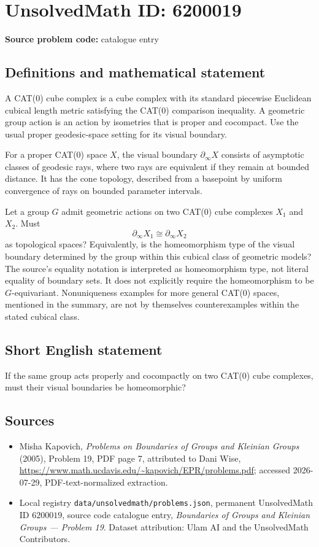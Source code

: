 \documentclass[11pt]{article}
\begin{document}
\section*{UnsolvedMath ID: 6200019}
\textbf{Source problem code:} catalogue entry
\subsection{Definitions and mathematical statement}
A CAT(0) cube complex is a cube complex with its standard piecewise Euclidean cubical length metric satisfying the CAT(0) comparison inequality. A geometric group action is an action by isometries that is proper and cocompact. Use the usual proper geodesic-space setting for its visual boundary.

For a proper CAT(0) space $X$, the visual boundary $\partial_\infty X$ consists of asymptotic classes of geodesic rays, where two rays are equivalent if they remain at bounded distance. It has the cone topology, described from a basepoint by uniform convergence of rays on bounded parameter intervals.

Let a group $G$ admit geometric actions on two CAT(0) cube complexes $X_1$ and $X_2$. Must
\[
\partial_\infty X_1\cong\partial_\infty X_2
\]
as topological spaces? Equivalently, is the homeomorphism type of the visual boundary determined by the group within this cubical class of geometric models? The source's equality notation is interpreted as homeomorphism type, not literal equality of boundary sets. It does not explicitly require the homeomorphism to be $G$-equivariant. Nonuniqueness examples for more general CAT(0) spaces, mentioned in the summary, are not by themselves counterexamples within the stated cubical class.
\subsection{Short English statement}
If the same group acts properly and cocompactly on two CAT(0) cube complexes, must their visual boundaries be homeomorphic?
\subsection{Sources}
\begin{itemize}
\item Misha Kapovich, \emph{Problems on Boundaries of Groups and Kleinian Groups} (2005), Problem 19, PDF page 7, attributed to Dani Wise, \url{https://www.math.ucdavis.edu/~kapovich/EPR/problems.pdf}; accessed 2026-07-29, PDF-text-normalized extraction.
\item Local registry \texttt{data/unsolvedmath/problems.json}, permanent UnsolvedMath ID $6200019$, source code catalogue entry, \emph{Boundaries of Groups and Kleinian Groups --- Problem 19}. Dataset attribution: Ulam AI and the UnsolvedMath Contributors.
\end{itemize}
\end{document}
